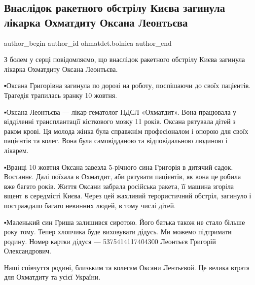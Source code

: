  
 
 
 
 
 
\subsection{Внаслідок ракетного обстрілу Києва загинула лікарка Охматдиту Оксана Леонтьєва}
\label{sec:11_10_2022.fb.ohmatdet.bolnica.1.oksana_leontjeva}
 
\ifcmt
 author_begin
   author_id ohmatdet.bolnica
 author_end
\fi

З болем у серці повідомляємо, що внаслідок ракетного обстрілу Києва загинула
лікарка Охматдиту Оксана Леонтьєва.🙏

▪️Оксана Григорівна загинула по дорозі на роботу, поспішаючи до своїх пацієнтів.
Трагедія трапилась зранку 10 жовтня. 

▪️Оксана Леонтьєва — лікар-гематолог НДСЛ «Охматдит». Вона працювала у
відділенні трансплантації кісткового мозку 11 років. Оксана рятувала дітей з
раком крові. Ця молода жінка була справжнім професіоналом і опорою для своїх
пацієнтів та колег. Вона була самовідданою та відповідальною людиною і лікарем. 

▪️Вранці 10 жовтня Оксана завезла 5-річного сина Григорія в дитячий садок.
Востаннє. Далі поїхала в Охматдит, аби рятувати пацієнтів, як вона це робила
вже багато років. Життя Оксани забрала російська ракета, її машина згоріла
вщент в середмісті Києва. Через цей жахливий терористичний обстріл, загинуло і
постраждало багато невинних людей, в тому числі дітей. 

▪️Маленький син Гриша залишився сиротою. Його батька також не стало більше року
тому. Тепер хлопчика буде виховувати дідусь. Ми можемо підтримати родину. Номер
картки дідуся — 5375414117404300 Леонтьєв Григорій Олександрович.

Наші співчуття родині, близьким та колегам Оксани Лентьєвой. Це велика втрата
для Охматдиту та усієї України.

